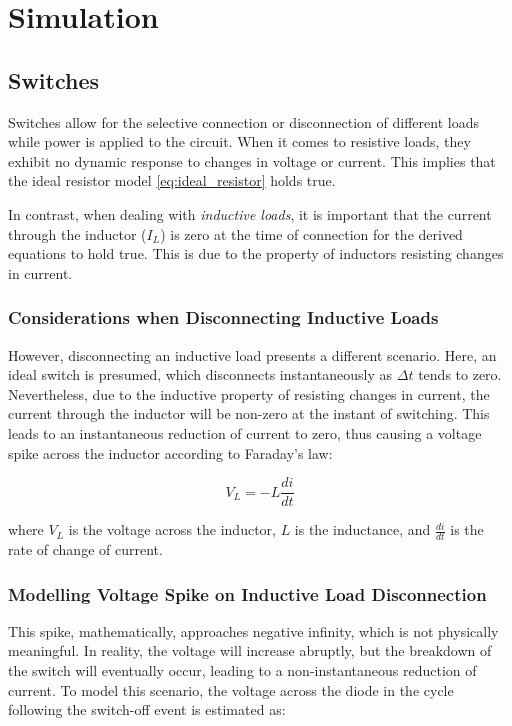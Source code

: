 \section{Simulation}
\subsection{Switches}
Switches allow for the selective connection or disconnection of different loads while power is applied to the circuit. When it comes to resistive loads, they exhibit no dynamic response to changes in voltage or current. This implies that the ideal resistor model \eqref{eq:ideal_resistor} holds true.
\leavevmode\newline

In contrast, when dealing with \textit{inductive loads}, it is important that the current through the inductor ($I_L$) is zero at the time of connection for the derived equations to hold true. This is due to the property of inductors resisting changes in current. \citep{inductor}

\subsubsection{Considerations when Disconnecting Inductive Loads}
However, disconnecting an inductive load presents a different scenario. Here, an ideal switch is presumed, which disconnects instantaneously as $\Delta t$ tends to zero. Nevertheless, due to the inductive property of resisting changes in current, the current through the inductor will be non-zero at the instant of switching. This leads to an instantaneous reduction of current to zero, thus causing a voltage spike across the inductor according to Faraday's law: \citep{inductor2}

\begin{equation}
V_L = -L \frac{di}{dt}
\end{equation}

where $V_L$ is the voltage across the inductor, $L$ is the inductance, and $\frac{di}{dt}$ is the rate of change of current.

\subsubsection{Modelling Voltage Spike on Inductive Load Disconnection}

This spike, mathematically, approaches negative infinity, which is not physically meaningful. In reality, the voltage will increase abruptly, but the breakdown of the switch will eventually occur, leading to a non-instantaneous reduction of current. To model this scenario, the voltage across the diode in the cycle following the switch-off event is estimated as:

